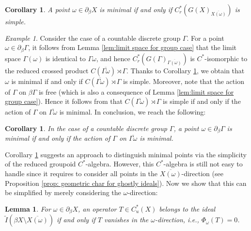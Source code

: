 \documentclass[12pt, a4paper]{amsart}
\numberwithin{equation}{section}
\newtheorem{cor}[thm]{Corollary}
\newtheorem{lem}[thm]{Lemma}
\theoremstyle{definition}
\theoremstyle{remark}
\newtheorem{ex}[thm]{Example}
\begin{document}
\begin{cor}\label{cor:simple char for max ideal}
A point $\omega \in \partial_\beta X$ is minimal \emph{if and only if} $C^*_r(G(X)_{\overline{X(\omega)}})$ is simple.
\end{cor}

\begin{ex}\label{ex:group case minimal}
Consider the case of a countable discrete group $\Gamma$. For a point $\omega \in \partial_\beta \Gamma$, it follows from Lemma \ref{lem:limit space for group case} that the limit space $\Gamma(\omega)$ is identical to $\Gamma \omega$, and hence $C^*_r(G(\Gamma)_{\overline{\Gamma(\omega)}})$ is $C^*$-isomorphic to the reduced crossed product $C(\overline{\Gamma \omega}) \rtimes \Gamma$. Thanks to Corollary \ref{cor:simple char for max ideal}, we obtain that $\omega$ is minimal if and only if $C(\overline{\Gamma \omega}) \rtimes \Gamma$ is simple. Moreover, note that the action of $\Gamma$ on $\beta \Gamma$ is free (which is also a consequence of Lemma \ref{lem:limit space for group case}). Hence it follows from \cite[Corollary 4.6]{Ren91} that $C(\overline{\Gamma \omega}) \rtimes \Gamma$ is simple if and only if the action of $\Gamma$ on $\overline{\Gamma \omega}$ is minimal. In conclusion, we reach the following:

\begin{cor}
In the case of a countable discrete group $\Gamma$, a point $\omega \in \partial_\beta \Gamma$ is minimal \emph{if and only if} the action of $\Gamma$ on $\overline{\Gamma \omega}$ is minimal.
\end{cor}
\end{ex}

Corollary \ref{cor:simple char for max ideal} suggests an approach to distinguish minimal points via the simplicity of the reduced groupoid $C^*$-algebra. However, this $C^*$-algebra is still not easy to handle since it requires to consider all points in the $\overline{X(\omega)}$-direction (see Proposition \ref{prop: geometric char for ghostly ideals}). 
Now we show that this can be simplified by merely considering the $\omega$-direction:

\begin{lem}\label{lem:simplification of maximal ideal}
For $\omega \in \partial_\beta X$, an operator $T\in C^*_u(X)$ belongs to the ideal $\tilde{I}(\beta X \setminus \overline{X(\omega)})$ \emph{if and only if} $T$ vanishes in the $\omega$-direction, \emph{i.e.}, $\Phi_\omega(T)=0$.
\end{lem}
\end{document}
